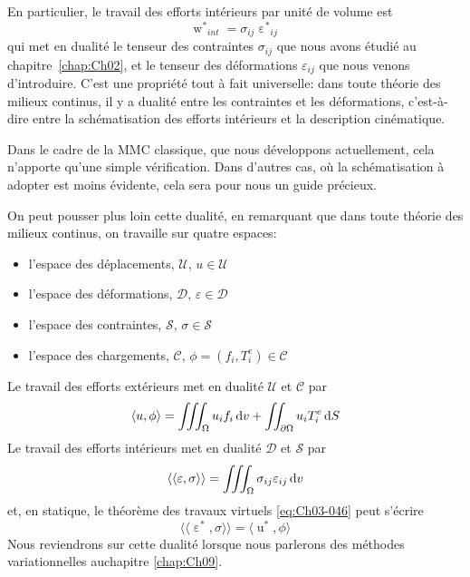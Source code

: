 En particulier, le travail des efforts intérieurs par unité de volume est
\begin{equation}
    {\mathop{w}^*}_{int} = \sigma_{ij} {\mathop{\varepsilon}^*}_{ij}
    \label{eq:Ch03-047}
\end{equation}
qui met en dualité le tenseur des contraintes $\sigma_{ij}$ que nous avons étudié au chapitre~\ref{chap:Ch02}, et le tenseur des déformations $\varepsilon_{ij}$ que nous venons d'introduire.
C'est une propriété tout à fait universelle: dans toute théorie des milieux continus, il y a dualité entre les contraintes et les déformations, c'est-à-dire entre la schématisation des efforts intérieurs et la description cinématique.

Dans le cadre de la MMC classique, que nous développons actuellement, cela n'apporte qu'une simple vérification.
Dans d'autres cas, où la schématisation à adopter est moins évidente, cela sera pour nous un guide précieux.

On peut pousser plus loin cette dualité, en remarquant que dans toute théorie des milieux continus, on travaille sur quatre espaces:
\begin{itemize}
    \item l'espace des déplacements, $\mathcal{U}$,  $u \in \mathcal{U}$
    \item l'espace des déformations, $\mathcal{D}$, $\varepsilon \in \mathcal{D}$
    \item l'espace des contraintes, $\mathcal{S}$,  $\sigma \in \mathcal{S}$
    \item l'espace des chargements, $\mathcal{C}$, $\phi = \left( f_i, T_i^e \right) \in \mathcal{C}$
\end{itemize}
Le travail des efforts extérieurs met en dualité $\mathcal{U}$ et $\mathcal{C}$ par
\begin{equation}
    \langle u, \phi \rangle = \iiint_{\Omega} u_i f_i \mathop{\mathrm{{}d}}\mathopen{} v + \iint_{\partial \Omega} u_{i} T_i^e \mathop{\mathrm{{}d}}\mathopen{} S
    \label{eq:Ch03-048}
\end{equation}
Le travail des efforts intérieurs met en dualité $\mathcal{D}$ et $\mathcal{S}$ par
\begin{equation}
    \langle\langle \varepsilon, \sigma \rangle\rangle = \iiint_{\Omega} \sigma_{ij} \varepsilon_{ij} \mathop{\mathrm{{}d}}\mathopen{} v
    \label{eq:Ch03-049}
\end{equation}
et, en statique, le théorème des travaux virtuels \eqref{eq:Ch03-046} peut s'écrire
\begin{equation}
    \langle\langle \mathop{\varepsilon}^* , \sigma \rangle \rangle = \langle \mathop{u}^* , \phi \rangle
    \label{eq:Ch03-050}
\end{equation}
Nous reviendrons sur cette dualité lorsque nous parlerons des méthodes variationnelles auchapitre \ref{chap:Ch09}.
